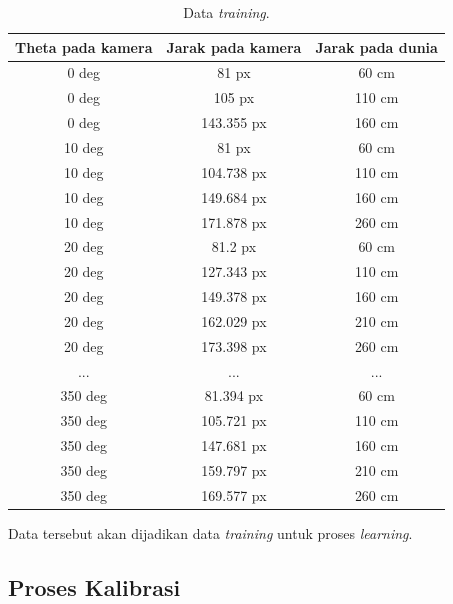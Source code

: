 \begin{longtable}{|c|c|c|}
  \caption{Data \textit{training}.}
  \label{tb:datatrain}                                   \\
  \hline
  \rowcolor[HTML]{C0C0C0}
  \textbf{Theta pada kamera} & \textbf{Jarak pada kamera} & \textbf{Jarak pada dunia} \\
  \hline
  0 deg            & 81 px                & 60 cm            \\
  0 deg            & 105 px                & 110 cm            \\
  0 deg           & 143.355 px                & 160 cm            \\
  10 deg           & 81 px                & 60 cm           \\
  10 deg           & 104.738 px                & 110 cm           \\
  10 deg           & 149.684 px                & 160 cm           \\
  10 deg           & 171.878 px                & 260 cm           \\
  20 deg           & 81.2 px                & 60 cm           \\
  20 deg           & 127.343 px                & 110 cm           \\
  20 deg           & 149.378 px                & 160 cm           \\
  20 deg           & 162.029 px                & 210 cm           \\
  20 deg           & 173.398 px                & 260 cm           \\
  ...           & ...                & ...           \\
  350 deg           & 81.394 px                & 60 cm           \\
  350 deg           & 105.721 px                & 110 cm           \\
  350 deg           & 147.681 px                & 160 cm           \\
  350 deg           & 159.797 px                & 210 cm           \\
  350 deg           & 169.577 px                & 260 cm           \\
  \hline
\end{longtable}

Data tersebut akan dijadikan data \textit{training} untuk proses \emph{learning}.

\subsection{Proses Kalibrasi}


